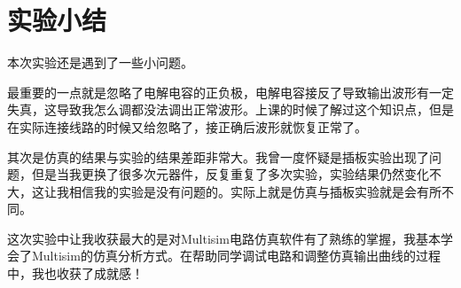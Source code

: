 \documentclass[a4paper,11pt,UTF8]{article}
\numberwithin{equation}{subsection}
\begin{document}
\section{实验小结}
本次实验还是遇到了一些小问题。

最重要的一点就是忽略了电解电容的正负极，电解电容接反了导致输出波形有一定失真，这导致我怎么调都没法调出正常波形。上课的时候了解过这个知识点，但是在实际连接线路的时候又给忽略了，接正确后波形就恢复正常了。

其次是仿真的结果与实验的结果差距非常大。我曾一度怀疑是插板实验出现了问题，但是当我更换了很多次元器件，反复重复了多次实验，实验结果仍然变化不大，这让我相信我的实验是没有问题的。实际上就是仿真与插板实验就是会有所不同。

这次实验中让我收获最大的是对Multisim电路仿真软件有了熟练的掌握，我基本学会了Multisim的仿真分析方式。在帮助同学调试电路和调整仿真输出曲线的过程中，我也收获了成就感！
\end{document}
